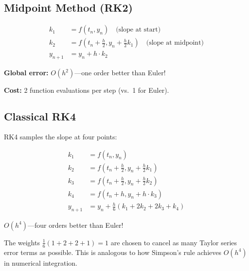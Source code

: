 \subsection{Midpoint Method (RK2)}

\begin{align}
    k_1 &= f(t_n, y_n) \quad \text{(slope at start)} \\
    k_2 &= f\left(t_n + \frac{h}{2}, y_n + \frac{h}{2} k_1\right) \quad \text{(slope at midpoint)} \\
    y_{n+1} &= y_n + h \cdot k_2
\end{align}


\textbf{Global error:} $O(h^2)$---one order better than Euler!

\textbf{Cost:} 2 function evaluations per step (vs.\ 1 for Euler).


\subsection{Classical RK4}

 RK4 samples the slope at four points:

\begin{align}
    k_1 &= f(t_n, y_n) \\
    k_2 &= f\left(t_n + \frac{h}{2}, y_n + \frac{h}{2} k_1\right) \\
    k_3 &= f\left(t_n + \frac{h}{2}, y_n + \frac{h}{2} k_2\right) \\
    k_4 &= f(t_n + h, y_n + h \cdot k_3) \\
    y_{n+1} &= y_n + \frac{h}{6}(k_1 + 2k_2 + 2k_3 + k_4)
\end{align}


 $O(h^4)$---four orders better than Euler!

 The weights $\frac{1}{6}(1 + 2 + 2 + 1) = 1$ are chosen to cancel as many Taylor series error terms as possible. This is analogous to how Simpson's rule achieves $O(h^4)$ in numerical integration.

